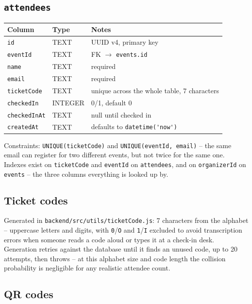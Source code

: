 ﻿\documentclass[11pt,letterpaper]{report}
\newcommand{\code}[1]{\lstinline[breaklines=true]{#1}}
\begin{document}
\subsection{\code{attendees}}
\begin{center}
\begin{tabular}{p{3cm}p{2cm}p{8cm}}
\toprule
\textbf{Column} & \textbf{Type} & \textbf{Notes} \\
\midrule
\code{id} & TEXT & UUID v4, primary key \\
\code{eventId} & TEXT & FK $\rightarrow$ \code{events.id} \\
\code{name} & TEXT & required \\
\code{email} & TEXT & required \\
\code{ticketCode} & TEXT & unique across the whole table, 7 characters \\
\code{checkedIn} & INTEGER & 0/1, default 0 \\
\code{checkedInAt} & TEXT & null until checked in \\
\code{createdAt} & TEXT & defaults to \code{datetime('now')} \\
\bottomrule
\end{tabular}
\end{center}

Constraints: \code{UNIQUE(ticketCode)} and \code{UNIQUE(eventId, email)}
-- the same email can register for two different events, but not
twice for the same one. Indexes exist on \code{ticketCode} and
\code{eventId} on \code{attendees}, and on \code{organizerId} on
\code{events} -- the three columns everything is looked up by.

\subsection{Ticket codes}

Generated in \code{backend/src/utils/ticketCode.js}: 7 characters from
the alphabet \texttt{} -- uppercase
letters and digits, with \code{0}/\code{O} and \code{1}/\code{I}
excluded to avoid transcription errors when someone reads a code aloud
or types it at a check-in desk. Generation retries against the
database until it finds an unused code, up to 20 attempts, then
throws -- at this alphabet size and code length the collision
probability is negligible for any realistic attendee count.

\subsection{QR codes}
\end{document}
